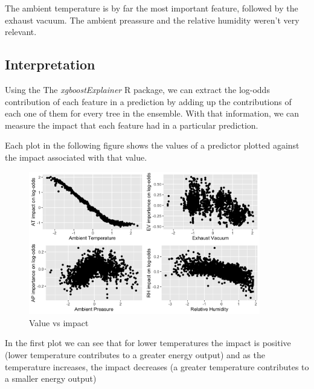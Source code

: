 The ambient temperature is by far the most important feature, followed by the exhaust vacuum. The ambient preassure and the relative humidity weren't very relevant.

\subsection{Interpretation}

Using the The \textit{xgboostExplainer} R package, we can extract the log-odds contribution of each feature in a prediction by adding up the contributions of each one of them for every tree in the ensemble. With that information, we can measure the impact that each feature had in a particular prediction.

Each plot in the following figure shows the values of a predictor plotted against the impact associated with that value.

\begin{figure}[H]
    \begin{center}
        \includegraphics[width=0.9\textwidth]{img/expl_all.jpg}
        \caption{Value vs impact}
    \end{center}
\end{figure}
In the first plot we can see that for lower temperatures the impact is positive (lower temperature contributes to a greater energy output) and as the temperature increases, the impact decreases (a greater temperature contributes to a smaller energy output)

